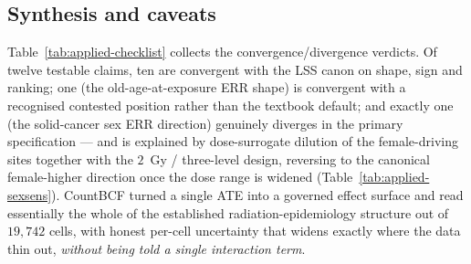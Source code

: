 \documentclass[11pt]{article}
\begin{document}
\subsection{Synthesis and caveats}
\label{sec:applied-synthesis}

Table~\ref{tab:applied-checklist} collects the convergence/divergence
verdicts. Of twelve testable claims, ten are convergent with the LSS canon on
shape, sign and ranking; one (the old-age-at-exposure ERR shape) is
convergent with a recognised contested position rather than the textbook
default; and exactly one (the solid-cancer sex ERR direction) genuinely
diverges in the primary specification --- and is explained by dose-surrogate
dilution of the female-driving sites together with the $2$~Gy / three-level
design, reversing to the canonical female-higher direction once the dose
range is widened (Table~\ref{tab:applied-sexsens}). CountBCF turned a
single ATE into a governed effect surface and read essentially the whole of
the established radiation-epidemiology structure out of $19{,}742$ cells,
with honest per-cell uncertainty that widens exactly where the data thin out,
\emph{without being told a single interaction term}.
\end{document}
